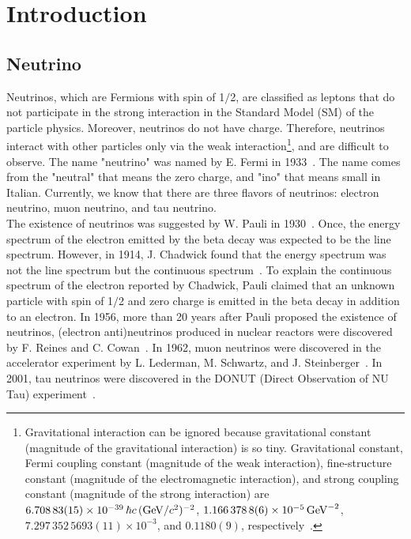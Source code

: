 

\section{Introduction}\label{Section_Introd}
\subsection{Neutrino}
\vs\hs
Neutrinos, which are Fermions with spin of 1$/$2, are classified as leptons that do not participate in the strong interaction in the Standard Model (SM) of the particle physics.
Moreover, neutrinos do not have charge.
Therefore, neutrinos interact with other particles only via the weak interaction\footnote{Gravitational interaction can be ignored because gravitational constant (magnitude of the gravitational interaction) is so tiny. Gravitational constant, Fermi coupling constant (magnitude of the weak interaction), fine-structure constant (magnitude of the electromagnetic interaction), and strong coupling constant (magnitude of the strong interaction) are $6.708\,83(15) \times 10^{-39}\,\hbar c\,({\rm GeV}/c^{2})^{-2}$, $1.166\,378\,8(6) \times 10^{-5}\,{\rm GeV}^{-2}$, $7.297\,352\,5693(11) \times 10^{-3}$, and $0.1180(9)$, respectively~\cite{2022Workman}.}, and are difficult to observe.
The name "neutrino" was named by E. Fermi in 1933~\cite{HistoryOfNeutrino}.
The name comes from the "neutral" that means the zero charge, and "ino" that means small in Italian.
Currently, we know that there are three flavors of neutrinos: electron neutrino, muon neutrino, and tau neutrino.\\
\hs
The existence of neutrinos was suggested by W. Pauli in 1930~\cite{HistoryOfNeutrino}.
Once, the energy spectrum of the electron emitted by the beta decay was expected to be the line spectrum.
However, in 1914, J. Chadwick found that the energy spectrum was not the line spectrum but the continuous spectrum~\cite{1914Chadwick}.
To explain the continuous spectrum of the electron reported by Chadwick, Pauli claimed that an unknown particle with spin of 1$/$2 and zero charge is emitted in the beta decay in addition to an electron.
In 1956, more than 20 years after Pauli proposed the existence of neutrinos, (electron anti)neutrinos produced in nuclear reactors were discovered by F. Reines and C. Cowan~\cite{1956Reines}.
In 1962, muon neutrinos were discovered in the accelerator experiment by L. Lederman, M. Schwartz, and J. Steinberger~\cite{1962Danby}.
In 2001, tau neutrinos were discovered in the DONUT (Direct Observation of NU Tau) experiment~\cite{2001Kodama}.





